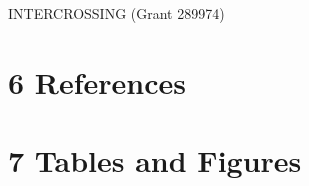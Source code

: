 \documentclass{frontiersSCNS} %
\begin{document}
INTERCROSSING (Grant 289974)

\section{6 References}\label{references}

\section{7 Tables and Figures}\label{tables-and-figures}


\end{document}
